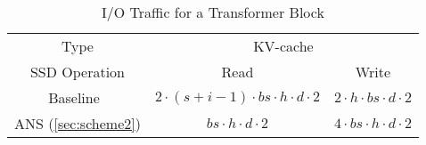 \begin{table}[t]
    \centering
    \caption{
    I/O Traffic for a Transformer Block  }
    \label{tab:traffic}
        
    \setlength{\tabcolsep}{3pt}
    \footnotesize
    \begin{tabular}{ccc}
    \toprule

    Type & \multicolumn{2}{c}{KV-cache} \\
    \cmidrule(lr){2-3}
    SSD Operation & Read & Write \\
    \midrule
    
    Baseline~\cite{flexgen} 
    &$2\cdot (s+i-1)\cdot bs\cdot h\cdot d\cdot 2$ 
    & $2\cdot h\cdot bs\cdot d\cdot 2$ \\
    
    ANS (\cref{sec:scheme2})              
    & $bs\cdot h \cdot d \cdot 2$ 
    & $4\cdot bs\cdot h\cdot d\cdot 2$ \\
    \bottomrule
    \end{tabular}

\end{table}